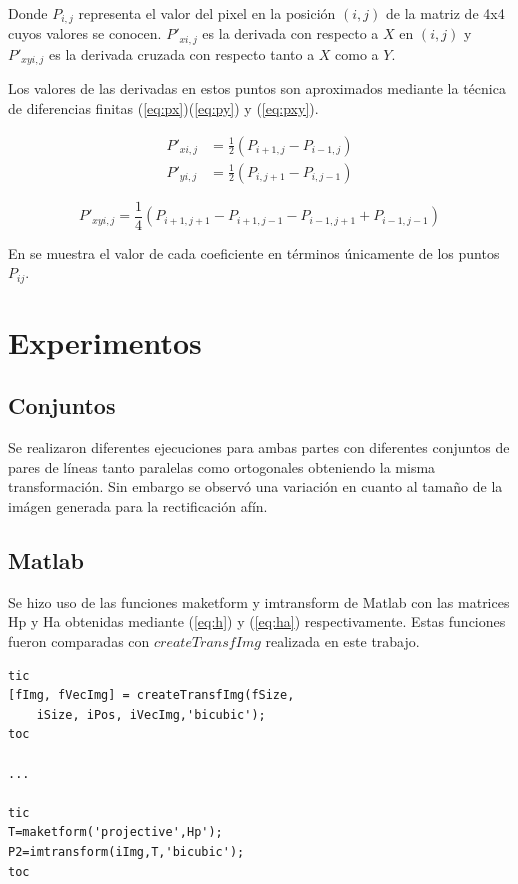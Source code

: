 \documentclass{IEEEtran}
\begin{document}
Donde $P_{i,j}$ representa el valor del pixel en la posición $(i,j)$ 
de la matriz de 4x4 cuyos valores se conocen.
$P'_{xi,j}$ es la derivada con respecto a $X$ en $(i,j)$ y $P'_{xyi,j}$ es la derivada
cruzada con respecto tanto a $X$ como a $Y$.

Los valores de las derivadas en estos puntos son aproximados mediante 
la técnica de diferencias finitas (\ref{eq:px})(\ref{eq:py}) y (\ref{eq:pxy}).

\begin{align}
P'_{xi,j}&=\frac{1}{2}(P_{i+1,j} - P_{i-1,j}) \label{eq:px} \\
P'_{yi,j}&=\frac{1}{2}(P_{i,j+1} - P_{i,j-1}) \label{eq:py} 
\end{align} 

\begin{equation}
P'_{xyi,j}=\frac{1}{4}(P_{i+1,j+1} - P_{i+1,j-1}- P_{i-1,j+1} + P_{i-1,j-1}) 
\label{eq:pxy}
\end{equation} 

En \cite{BicubicPaul} se muestra el valor de cada coeficiente en términos
únicamente de los puntos $P_{ij}$.


\section{Experimentos}

\subsection{Conjuntos}
Se realizaron diferentes ejecuciones para ambas partes 
con diferentes conjuntos de pares de líneas tanto paralelas
como ortogonales obteniendo la misma transformación. Sin embargo
se observó una variación en cuanto al tamaño de la
imágen generada para la rectificación afín.

\subsection{Matlab}

Se hizo uso de las funciones
maketform y imtransform de Matlab con las matrices Hp y Ha 
obtenidas mediante (\ref{eq:h}) y (\ref{eq:ha}) respectivamente.
Estas funciones fueron comparadas con $createTransfImg$ realizada
en este trabajo.

\begin{lstlisting}[frame=single]
tic
[fImg, fVecImg] = createTransfImg(fSize, 
	iSize, iPos, iVecImg,'bicubic');
toc

...

tic
T=maketform('projective',Hp');
P2=imtransform(iImg,T,'bicubic');
toc
\end{lstlisting}
\end{document}
